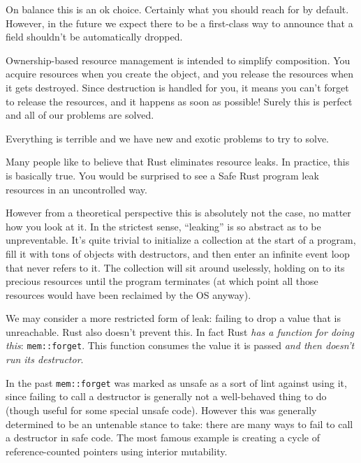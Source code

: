 \documentclass[a4paper,]{book}
\begin{document}
On balance this is an ok choice. Certainly what you should reach for by
default. However, in the future we expect there to be a first-class way
to announce that a field shouldn't be automatically dropped.


Ownership-based resource management is intended to simplify composition.
You acquire resources when you create the object, and you release the
resources when it gets destroyed. Since destruction is handled for you,
it means you can't forget to release the resources, and it happens as
soon as possible! Surely this is perfect and all of our problems are
solved.

Everything is terrible and we have new and exotic problems to try to
solve.

Many people like to believe that Rust eliminates resource leaks. In
practice, this is basically true. You would be surprised to see a Safe
Rust program leak resources in an uncontrolled way.

However from a theoretical perspective this is absolutely not the case,
no matter how you look at it. In the strictest sense, ``leaking'' is so
abstract as to be unpreventable. It's quite trivial to initialize a
collection at the start of a program, fill it with tons of objects with
destructors, and then enter an infinite event loop that never refers to
it. The collection will sit around uselessly, holding on to its precious
resources until the program terminates (at which point all those
resources would have been reclaimed by the OS anyway).

We may consider a more restricted form of leak: failing to drop a value
that is unreachable. Rust also doesn't prevent this. In fact Rust
\emph{has a function for doing this}: \texttt{mem::forget}. This
function consumes the value it is passed \emph{and then doesn't run its
destructor}.

In the past \texttt{mem::forget} was marked as unsafe as a sort of lint
against using it, since failing to call a destructor is generally not a
well-behaved thing to do (though useful for some special unsafe code).
However this was generally determined to be an untenable stance to take:
there are many ways to fail to call a destructor in safe code. The most
famous example is creating a cycle of reference-counted pointers using
interior mutability.
\end{document}
